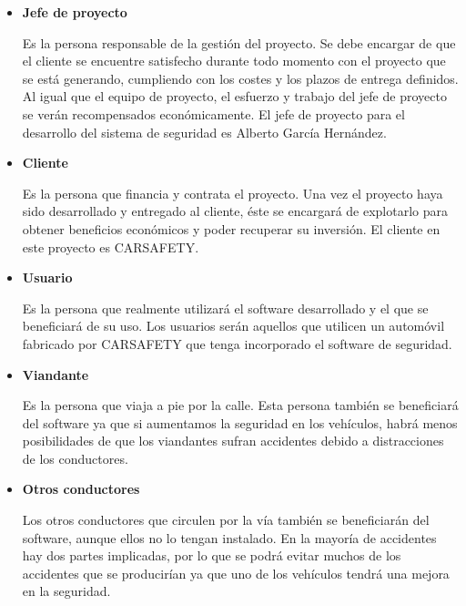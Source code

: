 \begin{itemize}[-]
\begin{itemize}[-]
\end{itemize}
\item \textbf{Jefe de proyecto}
\par Es la persona responsable de la gestión del proyecto. Se debe encargar de que el cliente se encuentre satisfecho durante todo momento con el proyecto que se está generando, cumpliendo con los costes y los plazos de entrega definidos. Al igual que el equipo de proyecto, el esfuerzo y trabajo del jefe de proyecto se verán recompensados económicamente. El jefe de proyecto para el desarrollo del sistema de seguridad es Alberto García Hernández.
\item \textbf{Cliente}
\par Es la persona que financia y contrata el proyecto. Una vez el proyecto haya sido desarrollado y entregado al cliente, éste se encargará de explotarlo para obtener beneficios económicos y poder recuperar su inversión. El cliente en este proyecto es CARSAFETY.
\item \textbf{Usuario}
\par Es la persona que realmente utilizará el software desarrollado y el que se beneficiará de su uso. Los usuarios serán aquellos que utilicen un automóvil fabricado por CARSAFETY que tenga incorporado el software de seguridad.
\item \textbf{Viandante}
\par Es la persona que viaja a pie por la calle. Esta persona también se beneficiará del software ya que si aumentamos la seguridad en los vehículos, habrá menos posibilidades de que los viandantes sufran accidentes debido a distracciones de los conductores.
\item \textbf{Otros conductores}
\par Los otros conductores que circulen por la vía también se beneficiarán del software, aunque ellos no lo tengan instalado. En la mayoría de accidentes hay dos partes implicadas, por lo que se podrá evitar muchos de los accidentes que se producirían ya que uno de los vehículos tendrá una mejora en la seguridad.
\end{itemize}
